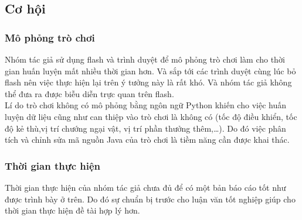 \documentclass[12pt,a4paper]{article}
\begin{document}
\subsection{Cơ hội}
\subsubsection{Mô phỏng trò chơi}
Nhóm tác giả sử dụng flash và trình duyệt để mô phỏng trò chơi làm cho thời gian huấn luyện mất nhiều thời gian hơn. Và sắp tới các trình duyệt cùng lúc bỏ flash nên việc thực hiện lại trên ý tưởng này là rất khó. Và nhóm tác giả không thể đưa ra được biễu diễn trực quan trên flash.\\
Lí do trò chơi không có mô phỏng bằng ngôn ngữ Python khiến cho việc huấn luyện dữ liệu cũng như can thiệp vào trò chơi là không có (tốc độ điều khiển, tốc độ kẻ thù,vị trí chướng ngại vật, vị trí phần thưởng thêm,\dots). Do đó việc phân tích và chỉnh sửa mã nguồn Java của trò chơi là tiềm năng cần được khai thác.
\subsubsection{Thời gian thực hiện}
Thời gian thực hiện của nhóm tác giả chưa đủ để có một bản báo cáo tốt như được trình bày ở trên. Do đó sự chuẩn bị trước cho luận văn tốt nghiệp giúp cho thời gian thực hiện đề tài hợp lý hơn.
\clearpage
\end{document}
